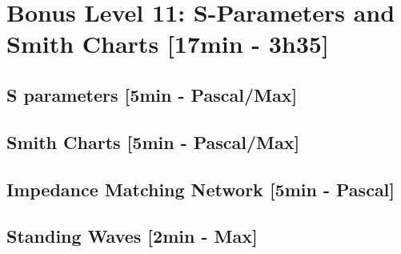 
\section{Bonus Level 11: S-Parameters and Smith Charts [17min - 3h35]}
\subsection{S parameters [5min - Pascal/Max]}
\subsection{Smith Charts [5min - Pascal/Max]}
\subsection{Impedance Matching Network [5min - Pascal]}
\subsection{Standing Waves [2min - Max]}